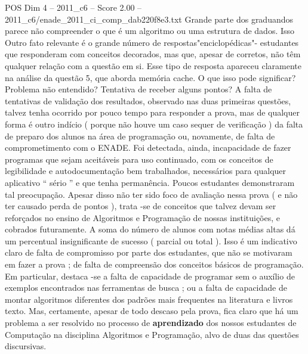 \begin{textsample}{POS Dim 4 – 2011\_c6 – Score 2.00 – 2011\_c6/enade\_2011\_ci\_comp\_dab220f8e3.txt}
Grande parte dos graduandos parece não compreender o que é um algoritmo ou uma estrutura de dados.
Isso Outro fato relevante é o grande número de respostas"enciclopédicas"- estudantes que responderam com conceitos decorados, mas que, apesar de corretos, não têm qualquer relação com a questão em si.
Esse tipo de resposta apareceu claramente na análise da questão 5, que aborda memória cache.
O que isso pode significar?
Problema não entendido?
Tentativa de receber alguns pontos?
A falta de tentativas de validação dos resultados, observado nas duas primeiras questões, talvez tenha ocorrido por pouco tempo para responder a prova, mas de qualquer forma é outro indício ( porque não houve um caso sequer de verificação ) da falta de preparo dos alunos na área de programação ou, novamente, de falta de comprometimento com o ENADE.
Foi detectada, ainda, incapacidade de fazer programas que sejam aceitáveis para uso continuado, com os conceitos de legibilidade e autodocumentação bem trabalhados, necessários para qualquer aplicativo “ sério ” e que tenha permanência.
Poucos estudantes demonstraram tal preocupação.
Apesar disso não ter sido foco de avaliação nessa prova ( e não ter causado perda de pontos ), trata -se de conceitos que talvez devam ser reforçados no ensino de Algoritmos e Programação de nossas instituições, e cobrados futuramente.
A soma do número de alunos com notas médias altas dá um percentual insignificante de sucesso ( parcial ou total ).
Isso é um indicativo claro de falta de compromisso por parte dos estudantes, que não se motivaram em fazer a prova ; de falta de compreensão dos conceitos básicos de programação.
Em particular, destaca -se a falta de capacidade de programar sem o auxílio de exemplos encontrados nas ferramentas de busca ; ou a falta de capacidade de montar algoritmos diferentes dos padrões mais frequentes na literatura e livros texto.
Mas, certamente, apesar de todo descaso pela prova, fica claro que há um problema a ser resolvido no processo de \textbf{aprendizado} dos nossos estudantes de Computação na disciplina Algoritmos e Programação, alvo de duas das questões discursivas.

\end{textsample}
